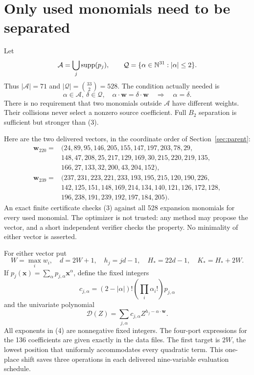 \documentclass[11pt]{article}
\theoremstyle{definition}\newtheorem{definition}[theorem]{Definition}
\begin{document}
\section{Only used monomials need to be separated}
\label{sec:sparse}

Let
\[
 \mathcal A=\bigcup_j\operatorname{supp}(p_j),\qquad
 \mathcal Q=\{\alpha\in\mathbb N^{31}:|\alpha|\leq2\}.
\]
Thus $|\mathcal A|=71$ and $|\mathcal Q|=\binom{33}{2}=528$.
The condition actually needed is
\[
 \alpha\in\mathcal A,\ \delta\in\mathcal Q,\quad
 \alpha\cdot\boldsymbol w=\delta\cdot\boldsymbol w
 \quad\Longrightarrow\quad\alpha=\delta.
 \tag{3}\label{eq:isolation}
\]
There is no requirement that two monomials outside $\mathcal A$ have
different weights. Their collisions never select a nonzero source
coefficient. Full $B_2$ separation is sufficient but stronger than (3).

Here are the two delivered vectors, in the coordinate order of
Section~\ref{sec:parent}:
\begin{align*}
\boldsymbol w_{220}={}&(24,89,95,146,205,155,147,197,203,78,29,\\
 &148,47,208,25,217,129,169,30,215,220,219,135,\\
 &166,27,133,32,200,43,204,152),\\[3pt]
\boldsymbol w_{239}={}&(237,231,223,221,233,193,195,215,120,190,226,\\
 &142,125,151,148,169,214,134,140,121,126,172,128,\\
 &196,238,191,239,192,197,184,205).
\end{align*}
An exact finite certificate checks (3) against all 528 expansion
monomials for every used monomial. The optimizer is not trusted: any
method may propose the vector, and a short independent verifier checks
the property. No minimality of either vector is asserted.

For either vector put
\[
 W=\max_iw_i,\quad d=2W+1,\quad h_j=jd-1,\quad
 H_* =22d-1,\quad K_*=H_*+2W.
\]
If $p_j(\boldsymbol x)=\sum_\alpha p_{j,\alpha}\boldsymbol x^\alpha$,
define the fixed integers
\[
 c_{j,\alpha}=(2-|\alpha|)!\left(\prod_i\alpha_i!\right)p_{j,\alpha}
\]
and the univariate polynomial
\[
 \mathcal D(Z)=\sum_{j,\alpha}c_{j,\alpha}
                       Z^{h_j-\alpha\cdot\boldsymbol w}.
 \tag{4}\label{eq:D}
\]
All exponents in (4) are nonnegative fixed integers. The four-port
expressions for the 136 coefficients are given exactly in the data files.
The first target is $2W$, the lowest position that uniformly accommodates
every quadratic term. This one-place shift saves three operations in
each delivered nine-variable evaluation schedule.
\end{document}
